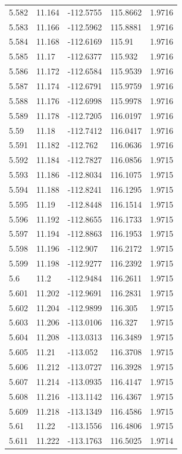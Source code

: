 \begin{tabular}{lllll}
5.582 & 11.164 & -112.5755 & 115.8662 & 1.9716 \\
5.583 & 11.166 & -112.5962 & 115.8881 & 1.9716 \\
5.584 & 11.168 & -112.6169 & 115.91 & 1.9716 \\
5.585 & 11.17 & -112.6377 & 115.932 & 1.9716 \\
5.586 & 11.172 & -112.6584 & 115.9539 & 1.9716 \\
5.587 & 11.174 & -112.6791 & 115.9759 & 1.9716 \\
5.588 & 11.176 & -112.6998 & 115.9978 & 1.9716 \\
5.589 & 11.178 & -112.7205 & 116.0197 & 1.9716 \\
5.59 & 11.18 & -112.7412 & 116.0417 & 1.9716 \\
5.591 & 11.182 & -112.762 & 116.0636 & 1.9716 \\
5.592 & 11.184 & -112.7827 & 116.0856 & 1.9715 \\
5.593 & 11.186 & -112.8034 & 116.1075 & 1.9715 \\
5.594 & 11.188 & -112.8241 & 116.1295 & 1.9715 \\
5.595 & 11.19 & -112.8448 & 116.1514 & 1.9715 \\
5.596 & 11.192 & -112.8655 & 116.1733 & 1.9715 \\
5.597 & 11.194 & -112.8863 & 116.1953 & 1.9715 \\
5.598 & 11.196 & -112.907 & 116.2172 & 1.9715 \\
5.599 & 11.198 & -112.9277 & 116.2392 & 1.9715 \\
5.6 & 11.2 & -112.9484 & 116.2611 & 1.9715 \\
5.601 & 11.202 & -112.9691 & 116.2831 & 1.9715 \\
5.602 & 11.204 & -112.9899 & 116.305 & 1.9715 \\
5.603 & 11.206 & -113.0106 & 116.327 & 1.9715 \\
5.604 & 11.208 & -113.0313 & 116.3489 & 1.9715 \\
5.605 & 11.21 & -113.052 & 116.3708 & 1.9715 \\
5.606 & 11.212 & -113.0727 & 116.3928 & 1.9715 \\
5.607 & 11.214 & -113.0935 & 116.4147 & 1.9715 \\
5.608 & 11.216 & -113.1142 & 116.4367 & 1.9715 \\
5.609 & 11.218 & -113.1349 & 116.4586 & 1.9715 \\
5.61 & 11.22 & -113.1556 & 116.4806 & 1.9715 \\
5.611 & 11.222 & -113.1763 & 116.5025 & 1.9714 \\

\end{tabular}
